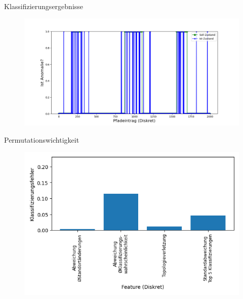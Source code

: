 \documentclass[10pt]{beamer}
\begin{document}
\begin{frame}{Klassifizierungsergebnisse}
    \begin{figure}
        \centering
        \includegraphics[width=\linewidth]{anomaly_detection/soll_vs_ist_anomaly.png}
    \end{figure}
\end{frame}

\begin{frame}{Permutationswichtigkeit}
    \begin{figure}
        \centering
        \includegraphics[width=\linewidth]{anomaly_detection/fi_anomaly_dt.png}
    \end{figure}
\end{frame}
\end{document}
